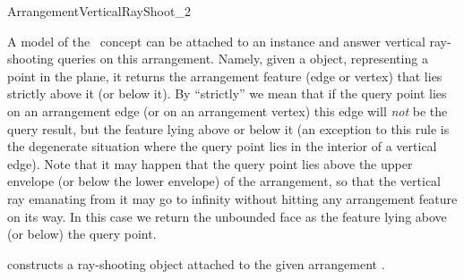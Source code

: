 
\ccRefPageBegin

\begin{ccRefConcept}{ArrangementVerticalRayShoot_2}

\ccDefinition

A model of the \ccRefName\ concept can be attached to an 
instance and answer vertical ray-shooting queries on this arrangement.
Namely, given a  object, representing a point in
the plane, it returns the arrangement feature (edge or vertex) that lies
strictly above it (or below it). By ``strictly'' we mean that if the
query point lies on an arrangement edge (or on an arrangement vertex) this
edge will {\em not} be the query result, but the feature lying above or
below it (an exception to this rule is the degenerate situation where the
query point lies in the interior of a vertical edge). Note that it may happen
that the query point lies above the upper envelope (or below the lower
envelope) of the arrangement, so that the vertical ray emanating from it
may go to infinity without hitting any arrangement feature on its way. In this
case we return the unbounded face as the feature lying above (or below) the
query point.

\ccTypes



\ccCreation
{}


  {constructs a ray-shooting object \ccVar{} attached to the given
   arrangement .}

\ccQueryFunctions


\end{ccRefConcept}
